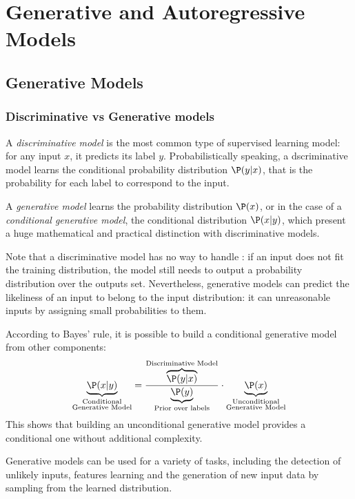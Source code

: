 \newpage

\section{Generative and Autoregressive Models}
\subsection{Generative Models}
\subsubsection{Discriminative vs Generative models}
A \emph{discriminative model} is the most common type of supervised learning model: for any input $x$, it predicts its label $y$. Probabilistically speaking, a dscriminative model learns the conditional probability distribution $\P(y|x)$, that is the probability for each label to correspond to the input.

A \emph{generative model} learns the probability distribution $\P(x)$, or in the case of a \emph{conditional generative model}, the conditional distribution $\P(x|y)$, which present a huge mathematical and practical distinction with discriminative models.

Note that a discriminative model has no way to handle : if an input does not fit the training distribution, the model still needs to output a probability distribution over the outputs set. Nevertheless, generative models can predict the likeliness of an input to belong to the input distribution: it can  unreasonable inputs by assigning small probabilities to them.

According to Bayes' rule, it is possible to build a conditional generative model from other components:
\begin{equation*}
    \underbrace{\P(x|y)}_{\substack{\text{Conditional}\\ \text{Generative Model}}} = \frac{\overbrace{\P(y|x)}^{\text{Discriminative Model}}}{\underbrace{\P(y)}_{\text{Prior over labels}}}\cdot\underbrace{\P(x)}_{\substack{\text{Unconditional}\\ \text{Generative Model}}}
\end{equation*}
This shows that building an unconditional generative model provides a conditional one without additional complexity.

Generative models can be used for a variety of tasks, including the detection of unlikely inputs, features learning and the generation of new input data by sampling from the learned distribution.


